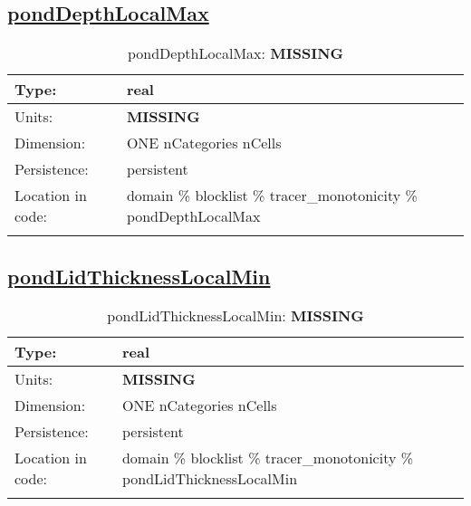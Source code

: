 \subsection[pondDepthLocalMax]{\hyperref[sec:var_tab_tracer_monotonicity]{pondDepthLocalMax}}
\label{subsec:var_sec_tracer_monotonicity_pondDepthLocalMax}
\begin{center}
\begin{longtable}{| p{2.0in} | p{4.0in} |}
        \hline 
        Type: & real \\
        \hline 
        Units: & {\bf \color{red} MISSING} \\
        \hline 
        Dimension: & ONE nCategories nCells \\
        \hline 
        Persistence: & persistent \\
        \hline 
         Location in code: & domain \% blocklist \% tracer\_monotonicity \% pondDepthLocalMax \\
         \hline 
    \caption{pondDepthLocalMax: {\bf \color{red} MISSING}}
\end{longtable}
\end{center}
\subsection[pondLidThicknessLocalMin]{\hyperref[sec:var_tab_tracer_monotonicity]{pondLidThicknessLocalMin}}
\label{subsec:var_sec_tracer_monotonicity_pondLidThicknessLocalMin}
\begin{center}
\begin{longtable}{| p{2.0in} | p{4.0in} |}
        \hline 
        Type: & real \\
        \hline 
        Units: & {\bf \color{red} MISSING} \\
        \hline 
        Dimension: & ONE nCategories nCells \\
        \hline 
        Persistence: & persistent \\
        \hline 
         Location in code: & domain \% blocklist \% tracer\_monotonicity \% pondLidThicknessLocalMin \\
         \hline 
    \caption{pondLidThicknessLocalMin: {\bf \color{red} MISSING}}
\end{longtable}
\end{center}
